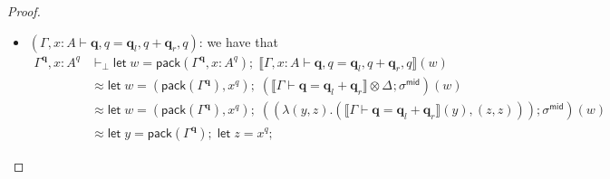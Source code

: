 \documentclass[acmsmall,screen,anonymous,review]{acmart}
\newcommand{\mb}[1]{\ensuremath{\mathbf{#1}}}
\newcommand{\ms}[1]{\ensuremath{\mathsf{#1}}}
\newcommand{\letexpr}[3]{\ensuremath{\ms{let}\;#1 = #2;\;#3}}
\newcommand{\qsp}[4]{#1 \vdash #2 = #3 + #4}
\newcommand{\dnt}[1]{\llbracket{#1}\rrbracket}
\newcommand{\dmor}[1]{{\Delta}_{#1}}
\begin{document}
\begin{proof}
\begin{itemize}
\begin{align*}
{          ((\lambda (y, z) . (\dnt{\qsp{\Gamma}{\mb{q}}{\mb{q}_l}{\mb{q}_r}}(y), ((), z))) 
            ; \sigma^{\ms{mid}})(w)
        } \\
        &\approx
        \letexpr{y}{\ms{pack}(\Gamma^{\mb{q}})}{
          \letexpr{z}{x^q}{
            \letexpr{u}{(\dnt{\qsp{\Gamma}{\mb{q}}{\mb{q}_l}{\mb{q}_r}}(y), ((), z))}
              {\sigma^{\ms{mid}}(u)}
          }
        }
        \\
        &\approx
        \letexpr{y}{\ms{pack}(\Gamma^{\mb{q}})}{
          \letexpr{u}{(\dnt{\qsp{\Gamma}{\mb{q}}{\mb{q}_l}{\mb{q}_r}}(y), ((), x^q))}
            {\sigma^{\ms{mid}}(u)}
        }
        \\
        &\approx
        \letexpr{u}{
          ((\letexpr{y}{\ms{pack}(\Gamma^{\mb{q}})}
            {(\dnt{\qsp{\Gamma}{\mb{q}}{\mb{q}_l}{\mb{q}_r}}(y)}), ((), x^q))
          }
          {\sigma^{\ms{mid}}(u)}
        \\
        &\approx
        \letexpr{((u_1, u_2), (u_3, u_4)}{
          ((\ms{pack}(\Gamma^{\mb{q}_l}), \ms{pack}(\Gamma^{\mb{q}_r})), ((), x^q))
          }
          {((u_1, u_3), (u_2, u_4))}
        \\
        &\approx
          (\ms{pack}(\Gamma^{\mb{q}_l}), ()), (\ms{pack}(\Gamma^{\mb{q}_r}), x^q))
        \\
        &\approx
          (\ms{pack}(\Gamma^{\mb{q}_l}, x : A^0), \ms{pack}(\Gamma^{\mb{q}_r}, x : A^q))
        : [\Gamma^{\mb{q}_l}, x : A^0] \otimes [\Gamma^{\mb{q}_r}, x : A^q]
    \end{align*}
    as desired.
    \item $(\qsp{\Gamma, x : A}{\mb{q}, q}{\mb{q}_l, q}{\mb{q}_r, q})$: we have that
    \begin{align*}
      \Gamma^{\mb{q}}, x : A^q &\vdash_\bot
        \letexpr{w}{\ms{pack}(\Gamma^{\mb{q}}, x : A^q)}
          {\dnt{\qsp{\Gamma, x : A}{\mb{q}, q}{\mb{q}_l, q}{\mb{q}_r, q}}(w)} \\
        &\approx
        \letexpr{w}{(\ms{pack}(\Gamma^{\mb{q}}), x^q)}{
          (\dnt{\qsp{\Gamma}{\mb{q}}{\mb{q}_l}{\mb{q}_r}} \otimes \dmor{}
            ; \sigma^{\ms{mid}})(w)
        } \\
        &\approx
        \letexpr{w}{(\ms{pack}(\Gamma^{\mb{q}}), x^q)}{
          ((\lambda (y, z) . (\dnt{\qsp{\Gamma}{\mb{q}}{\mb{q}_l}{\mb{q}_r}}(y), (z, z))) 
            ; \sigma^{\ms{mid}})(w)
        } \\
        &\approx
        \letexpr{y}{\ms{pack}(\Gamma^{\mb{q}})}{
          \letexpr{z}{x^q}{
}}
\end{align*}
\end{itemize}
\end{proof}
\end{document}
